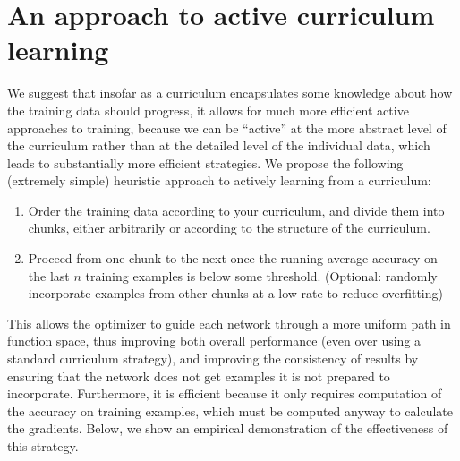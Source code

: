 \documentclass{article}
\begin{document}
\section{An approach to active curriculum learning}
We suggest that insofar as a curriculum encapsulates some knowledge about how the training data should progress, it allows for much more efficient active approaches to training, because we can be ``active'' at the more abstract level of the curriculum rather than at the detailed level of the individual data, which leads to substantially more efficient strategies. We propose the following (extremely simple) heuristic approach to actively learning from a curriculum:
\vspace{-0.5em}
\begin{enumerate}
\setlength\itemsep{0em}
\item Order the training data according to your curriculum, and divide them into chunks, either arbitrarily or according to the structure of the curriculum.
\item Proceed from one chunk to the next once the running average accuracy on the last $n$ training examples is below some threshold. (Optional: randomly incorporate examples from other chunks at a low rate to reduce overfitting)%

\end{enumerate} 
\vspace{-0.5em}
This allows the optimizer to guide each network through a more uniform path in function space, thus improving both overall performance (even over using a standard curriculum strategy), and improving the consistency of results by ensuring that the network does not get examples it is not prepared to incorporate. Furthermore, it is efficient because it only requires computation of the accuracy on training examples, which must be computed anyway to calculate the gradients. Below, we show an empirical demonstration of the effectiveness of this strategy.
\end{document}
